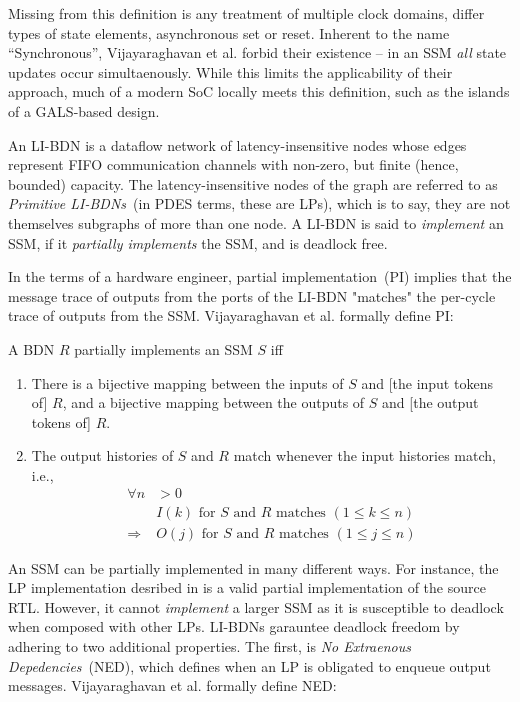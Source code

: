 Missing from this definition is any treatment of multiple clock domains, differ
types of state elements, asynchronous set or reset.  Inherent to the name
``Synchronous'', Vijayaraghavan et al. forbid their existence -- in an SSM
\emph{all} state updates occur simultaenously. While this limits the
applicability of their approach, much of a modern SoC locally meets this
definition, such as the islands of a GALS-based design.

An LI-BDN is a dataflow network of latency-insensitive nodes whose
edges represent FIFO communication channels with non-zero, but finite (hence,
bounded) capacity. The latency-insensitive nodes of the graph are
referred to as \emph{Primitive LI-BDNs}~(in PDES terms, these are LPs), which is to say, they 
are not themselves subgraphs of more than one node. A
LI-BDN is said to \emph{implement} an SSM, if it \emph{partially implements}
the SSM, and is deadlock free.

In the terms of a hardware engineer, partial implementation~(PI) implies that
the message trace of outputs from the ports of the LI-BDN "matches" the
per-cycle trace of outputs from the SSM. Vijayaraghavan et al.\cite{LIBDN}
formally define PI:

\begin{widequote}
A BDN $R$ partially implements an SSM $S$ iff
\begin{enumerate}
\item There is a bijective mapping between the inputs of $S$ and
[the input tokens of] $R$, and a bijective mapping between the outputs of $S$ and
[the output tokens of] $R$.
\item The output histories of $S$ and $R$ match whenever the
input histories match, i.e.,
\begin{align*}
\forall n &> 0\\
&\text{$I(k)$ for $S$ and $R$ matches $(1 \leq k \leq n)$}\\
\Rightarrow &\text{$O(j)$ for $S$ and $R$ matches $(1 \leq j \leq n)$}
\end{align*}
\end{enumerate}
\end{widequote}

An SSM can be partially implemented in many different ways. For instance, the
LP implementation desribed in  is a valid partial implementation of
the source RTL. However, it cannot \emph{implement} a larger SSM as it is
susceptible to deadlock when composed with other LPs.  LI-BDNs garauntee
deadlock freedom by adhering to two additional properties. The first, is
\emph{No Extraenous Depedencies}~(NED), which defines when an LP is obligated to enqueue output messages. Vijayaraghavan et al.\cite{LIBDN} formally define NED:

